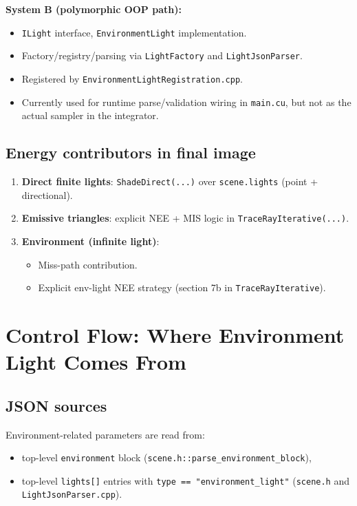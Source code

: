\documentclass[11pt]{article}
\begin{document}
\textbf{System B (polymorphic OOP path):}
\begin{itemize}[leftmargin=1.5em]
  \item \verb|ILight| interface, \verb|EnvironmentLight| implementation.
  \item Factory/registry/parsing via \verb|LightFactory| and \verb|LightJsonParser|.
  \item Registered by \verb|EnvironmentLightRegistration.cpp|.
  \item Currently used for runtime parse/validation wiring in \verb|main.cu|, but not as the actual sampler in the integrator.
\end{itemize}

\subsection{Energy contributors in final image}
\begin{enumerate}[leftmargin=1.5em]
  \item \textbf{Direct finite lights}: \verb|ShadeDirect(...)| over \verb|scene.lights| (point + directional).
  \item \textbf{Emissive triangles}: explicit NEE + MIS logic in \verb|TraceRayIterative(...)|.
  \item \textbf{Environment (infinite light)}:
  \begin{itemize}
    \item Miss-path contribution.
    \item Explicit env-light NEE strategy (section 7b in \verb|TraceRayIterative|).
  \end{itemize}
\end{enumerate}

\section{Control Flow: Where Environment Light Comes From}
\subsection{JSON sources}
Environment-related parameters are read from:
\begin{itemize}[leftmargin=1.5em]
  \item top-level \verb|environment| block (\verb|scene.h::parse_environment_block|),
  \item top-level \verb|lights[]| entries with \verb|type == "environment_light"| (\verb|scene.h| and \verb|LightJsonParser.cpp|).
\end{itemize}
\end{document}

